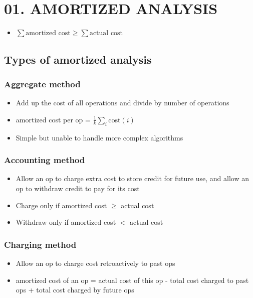 \documentclass[10pt]{article}
\begin{document}
\section{01. AMORTIZED ANALYSIS}

\begin{itemize}
	\item $\sum{\text{amortized cost}} \ge \sum{\text{actual cost}}$
\end{itemize}

\subsection{Types of amortized analysis}

\subsubsection{Aggregate method}

\begin{itemize}
	\item Add up the cost of all operations and divide by number of operations
	\item amortized cost per op = $\frac{1}{k} \sum_{i}{\text{cost}(i)}$
	\item Simple but unable to handle more complex algorithms
\end{itemize}

\subsubsection{Accounting method}

\begin{itemize}
	\item Allow an op to charge extra cost to store credit for future use, and allow an op to withdraw credit to pay for its cost
	\item Charge only if amortized cost $\ge$ actual cost
	\item Withdraw only if amortized cost $<$ actual cost
\end{itemize}

\subsubsection{Charging method}

\begin{itemize}
	\item Allow an op to charge cost retroactively to past ops
	\item amortized cost of an op = actual cost of this op - total cost charged to past ops + total cost charged by future ops
\end{itemize}
\end{document}
